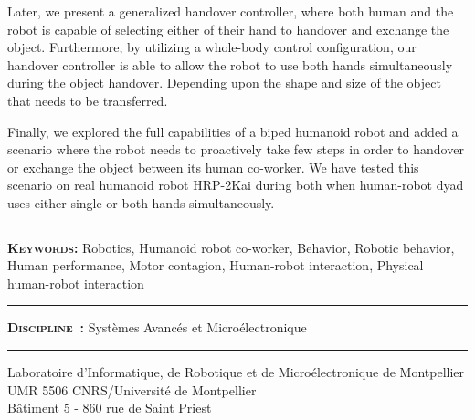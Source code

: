 Later, we present a generalized handover controller, where both human and the robot is capable of selecting either of their hand to handover and exchange the object. Furthermore, by utilizing a whole-body control configuration, our handover controller is able to allow the robot to use both hands simultaneously during the object handover. Depending upon the shape and size of the object that needs to be transferred.

Finally, we explored the full capabilities of a biped humanoid robot and added a scenario where the robot needs to proactively take few steps in order to handover or exchange the object between its human co-worker. We have tested this scenario on real humanoid robot HRP-2Kai during both when human-robot dyad uses either single or both hands simultaneously.







\vspace{3pt}\hrule\vspace{3pt}
\noindent \textbf{\textsc{Keywords:}}
Robotics, Humanoid robot co-worker, Behavior, Robotic behavior, Human performance, Motor contagion, Human-robot interaction, Physical human-robot interaction
\noindent \vspace{3pt}\hrule\vspace{3pt}
\noindent \textbf{\textsc{Discipline~:}}
Syst\`emes Avanc\'es et Micro\'electronique
\noindent \vspace{3pt}\hrule\vspace{3pt}
\noindent Laboratoire d'Informatique, de Robotique et de Micro\'electronique de Montpellier\\
UMR 5506 CNRS/Universit\'e de Montpellier\\
B\^atiment 5 - 860 rue de Saint Priest
